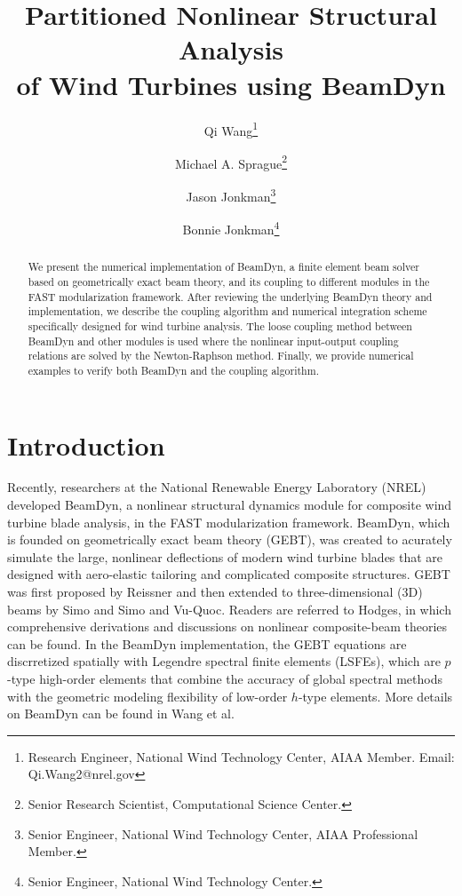 \documentclass{aiaa-tc}
\title{Partitioned Nonlinear Structural Analysis\\
of Wind Turbines using BeamDyn}
\author[]{Qi Wang\thanks{Research Engineer, National Wind Technology Center, AIAA Member. Email: Qi.Wang2@nrel.gov}}
\author[]{Michael A. Sprague\thanks{Senior Research Scientist, 
Computational Science Center.}}
\author[]{Jason Jonkman\thanks{Senior Engineer, National Wind Technology Center, AIAA Professional Member.}}
\author[]{Bonnie Jonkman\thanks{Senior Engineer, National Wind Technology Center.}}
\affil[]{National Renewable Energy Laboratory, Golden, CO 80401}
\begin{document}
\maketitle

\begin{abstract}
{We present the numerical implementation of BeamDyn, a finite element beam solver based on geometrically exact beam theory, and its coupling to different modules in the FAST modularization framework. 
After reviewing the underlying BeamDyn theory and implementation, we describe the coupling algorithm and numerical integration scheme specifically designed for wind turbine analysis. 
The loose coupling method between BeamDyn and other modules is used where the nonlinear input-output coupling relations are solved by the Newton-Raphson method. 
Finally, we provide numerical examples to verify both BeamDyn and the coupling algorithm. }     
\end{abstract}

\section{Introduction} 
Recently, researchers at the National Renewable Energy Laboratory (NREL) 
developed BeamDyn, a nonlinear structural dynamics module for composite wind turbine blade analysis, in the FAST modularization framework. 
BeamDyn, which is founded on geometrically exact beam theory (GEBT), was created to acurately simulate the large, nonlinear deflections of modern wind turbine blades that are designed with aero-elastic tailoring and complicated composite structures.
GEBT was first proposed by Reissner\cite{Ressiner1973} and then extended to three-dimensional (3D) beams by Simo\cite{Simo1985} and Simo and Vu-Quoc\cite{Simo1986}. 
Readers are referred to
Hodges,\cite{HodgesBeamBook} in which comprehensive derivations and discussions
on nonlinear composite-beam theories can be found. 
In the BeamDyn implementation, the GEBT equations are discrretized spatially with Legendre spectral finite elements (LSFEs), which are $p$-type high-order elements that combine the accuracy of global spectral methods with the geometric modeling flexibility of low-order $h$-type elements.
More details on BeamDyn can be found in Wang et al.\cite{Wang:GEBT2014}
\end{document}
